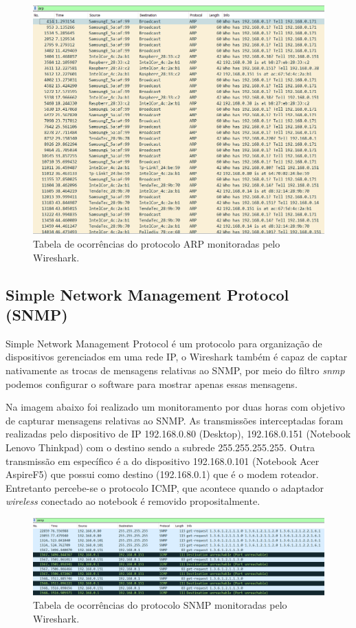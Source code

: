\documentclass[12pt]{article}
\begin{document}
\begin{figure}[H]
    \includegraphics[width=\linewidth]{ARP.png}
    \caption{Tabela de ocorrências do protocolo ARP monitoradas pelo Wireshark.}
\end{figure}

\subsection{Simple Network Management Protocol (SNMP)}

Simple Network Management Protocol é um protocolo para organização de dispositivos gerenciados em uma rede IP, o Wireshark também é capaz de captar nativamente as trocas de mensagens relativas ao SNMP, por meio do filtro \emph{snmp} podemos configurar o software para mostrar apenas essas mensagens.

Na imagem abaixo foi realizado um monitoramento por duas horas com objetivo de capturar mensagens relativas ao SNMP. As transmissões interceptadas foram realizadas pelo dispositivo de IP 192.168.0.80 (Desktop), 192.168.0.151 (Notebook Lenovo Thinkpad) com o destino sendo a subrede 255.255.255.255. Outra transmissão em específico é a do dispositivo 192.168.0.101 (Notebook Acer AspireF5) que possui como destino (192.168.0.1) que é o modem roteador. Entretanto percebe-se o protocolo ICMP, que acontece quando o adaptador \emph{wireless} conectado ao notebook é removido propositalmente. 

\begin{figure}[H]
    \includegraphics[width=\linewidth]{SNMP.png}
    \caption{Tabela de ocorrências do protocolo SNMP monitoradas pelo Wireshark.}
\end{figure}
\end{document}

